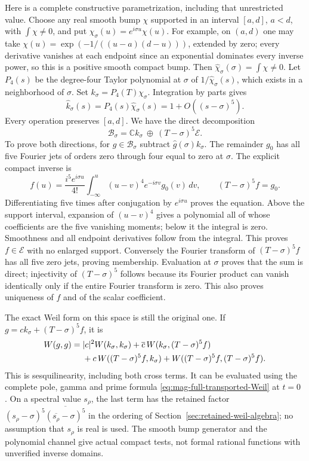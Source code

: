 Here is a complete constructive parametrization, including that
unrestricted value. Choose any real smooth bump $\chi$ supported
in an interval $[a,d]$, $a<d$, with $\int\chi\ne0$, and put
$\chi_\sigma(u)=e^{i\sigma u}\chi(u)$.
For example, on $(a,d)$ one may take
$\chi(u)=\exp(-1/((u-a)(d-u)))$, extended by zero; every derivative
vanishes at each endpoint since an exponential dominates every
inverse power, so this is a positive smooth compact bump.
Then $\widehat\chi_\sigma(\sigma)=\int\chi\ne0$.
Let $P_4(s)$ be the degree-four Taylor polynomial at $\sigma$ of
$1/\widehat\chi_\sigma(s)$, which exists in a neighborhood of
$\sigma$. Set $k_\sigma=P_4(T)\chi_\sigma$. Integration by parts gives
\[
 \widehat k_\sigma(s)=P_4(s)\widehat\chi_\sigma(s)
                      =1+O((s-\sigma)^5).
\]
Every operation preserves $[a,d]$. We have the direct decomposition
\begin{equation}
 \mathcal B_\sigma
   =\mathbb C k_\sigma\ \oplus\ (T-\sigma)^5\mathcal E.
 \label{eq:ej-Weil-channel}
\end{equation}
To prove both directions, for $g\in\mathcal B_\sigma$ subtract
$\widehat g(\sigma)k_\sigma$. The remainder $g_0$ has all five
Fourier jets of orders zero through four equal to zero at $\sigma$.
The explicit compact inverse is
\[
 f(u)=\frac{i^5e^{i\sigma u}}{4!}
       \int_{-\infty}^u(u-v)^4e^{-i\sigma v}g_0(v)\,dv,
 \qquad (T-\sigma)^5 f=g_0.
\]
Differentiating five times after conjugation by $e^{i\sigma u}$
proves the equation. Above the support interval, expansion of
$(u-v)^4$ gives a polynomial all of whose coefficients are the
five vanishing moments; below it the integral is zero. Smoothness
and all endpoint derivatives follow from the integral. This proves
$f\in\mathcal E$ with no enlarged support. Conversely the Fourier
transform of $(T-\sigma)^5 f$ has all five zero jets, proving
membership. Evaluation at $\sigma$ proves that the sum is direct;
injectivity of $(T-\sigma)^5$ follows because its Fourier product
can vanish identically only if the entire Fourier transform is zero.
This also proves uniqueness of $f$ and of the scalar coefficient.

The exact Weil form on this space is still the original one. If
$g=c k_\sigma+(T-\sigma)^5f$, it is
\begin{align}
 W(g,g)={}&|c|^2W(k_\sigma,k_\sigma)
   +\overline c\,W(k_\sigma,(T-\sigma)^5f)\notag\\
 &+c\,W((T-\sigma)^5f,k_\sigma)
   +W((T-\sigma)^5f,(T-\sigma)^5f).
 \label{eq:ej-Weil-full}
\end{align}
This is sesquilinearity, including both cross terms. It can be
evaluated using the complete pole, gamma and prime formula
\eqref{eq:mag-full-transported-Weil} at $t=0$
\cite{weil1952,alpogeFurman2026}. On a spectral value $s_\rho$,
the last term has the retained factor
$(s_\rho-\sigma)^5\overline{(\overline{s_\rho}-\sigma)^5}$
in the ordering of Section~\ref{sec:retained-weil-algebra};
no assumption that $s_\rho$ is real is used.
The smooth bump generator and the polynomial channel give actual
compact tests, not formal rational functions with unverified inverse domains.

